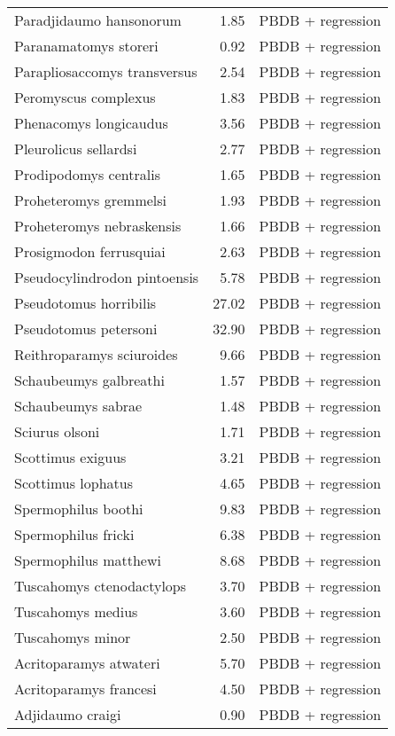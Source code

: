 \begin{table}[ht]
\begin{tabular}{lrl}
  Paradjidaumo hansonorum & 1.85 & PBDB + regression \\ 
  Paranamatomys storeri & 0.92 & PBDB + regression \\ 
  Parapliosaccomys transversus & 2.54 & PBDB + regression \\ 
  Peromyscus complexus & 1.83 & PBDB + regression \\ 
  Phenacomys longicaudus & 3.56 & PBDB + regression \\ 
  Pleurolicus sellardsi & 2.77 & PBDB + regression \\ 
  Prodipodomys centralis & 1.65 & PBDB + regression \\ 
  Proheteromys gremmelsi & 1.93 & PBDB + regression \\ 
  Proheteromys nebraskensis & 1.66 & PBDB + regression \\ 
  Prosigmodon ferrusquiai & 2.63 & PBDB + regression \\ 
  Pseudocylindrodon pintoensis & 5.78 & PBDB + regression \\ 
  Pseudotomus horribilis & 27.02 & PBDB + regression \\ 
  Pseudotomus petersoni & 32.90 & PBDB + regression \\ 
  Reithroparamys sciuroides & 9.66 & PBDB + regression \\ 
  Schaubeumys galbreathi & 1.57 & PBDB + regression \\ 
  Schaubeumys sabrae & 1.48 & PBDB + regression \\ 
  Sciurus olsoni & 1.71 & PBDB + regression \\ 
  Scottimus exiguus & 3.21 & PBDB + regression \\ 
  Scottimus lophatus & 4.65 & PBDB + regression \\ 
  Spermophilus boothi & 9.83 & PBDB + regression \\ 
  Spermophilus fricki & 6.38 & PBDB + regression \\ 
  Spermophilus matthewi & 8.68 & PBDB + regression \\ 
  Tuscahomys ctenodactylops & 3.70 & PBDB + regression \\ 
  Tuscahomys medius & 3.60 & PBDB + regression \\ 
  Tuscahomys minor & 2.50 & PBDB + regression \\ 
  Acritoparamys atwateri & 5.70 & PBDB + regression \\ 
  Acritoparamys francesi & 4.50 & PBDB + regression \\ 
  Adjidaumo craigi & 0.90 & PBDB + regression \\ 

\end{tabular}
\end{table}
